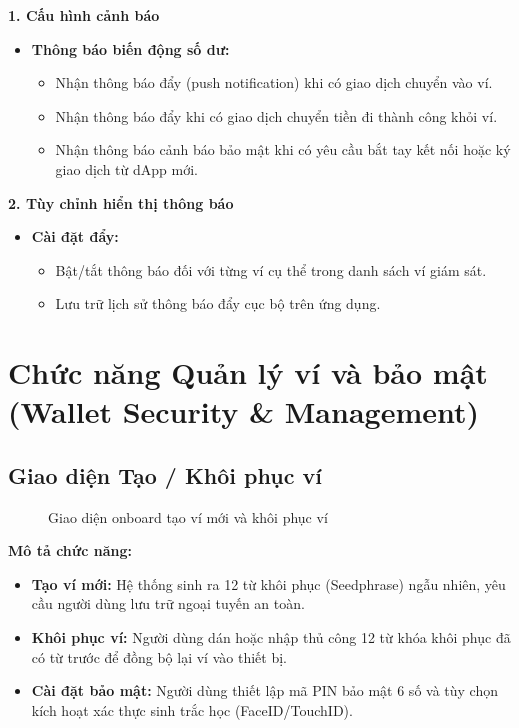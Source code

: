 \documentclass[a4paper]{report}
\begin{document}
\textbf{1. Cấu hình cảnh báo}
\begin{itemize}
    \item \textbf{Thông báo biến động số dư:}
    \begin{itemize}
        \item Nhận thông báo đẩy (push notification) khi có giao dịch chuyển vào ví.
        \item Nhận thông báo đẩy khi có giao dịch chuyển tiền đi thành công khỏi ví.
        \item Nhận thông báo cảnh báo bảo mật khi có yêu cầu bắt tay kết nối hoặc ký giao dịch từ dApp mới.
    \end{itemize}
\end{itemize}

\textbf{2. Tùy chỉnh hiển thị thông báo}
\begin{itemize}
    \item \textbf{Cài đặt đẩy:}
    \begin{itemize}
        \item Bật/tắt thông báo đối với từng ví cụ thể trong danh sách ví giám sát.
        \item Lưu trữ lịch sử thông báo đẩy cục bộ trên ứng dụng.
    \end{itemize}
\end{itemize}
\section{Chức năng Quản lý ví và bảo mật (Wallet Security \& Management)}

\subsection{Giao diện Tạo / Khôi phục ví}
\begin{figure}[h]
    \centering
    \caption{Giao diện onboard tạo ví mới và khôi phục ví}
    \label{fig:ui_onboard}
\end{figure}

\textbf{Mô tả chức năng:}
\begin{itemize}
    \item \textbf{Tạo ví mới:} Hệ thống sinh ra 12 từ khôi phục (Seedphrase) ngẫu nhiên, yêu cầu người dùng lưu trữ ngoại tuyến an toàn.
    \item \textbf{Khôi phục ví:} Người dùng dán hoặc nhập thủ công 12 từ khóa khôi phục đã có từ trước để đồng bộ lại ví vào thiết bị.
    \item \textbf{Cài đặt bảo mật:} Người dùng thiết lập mã PIN bảo mật 6 số và tùy chọn kích hoạt xác thực sinh trắc học (FaceID/TouchID).
\end{itemize}
\end{document}
